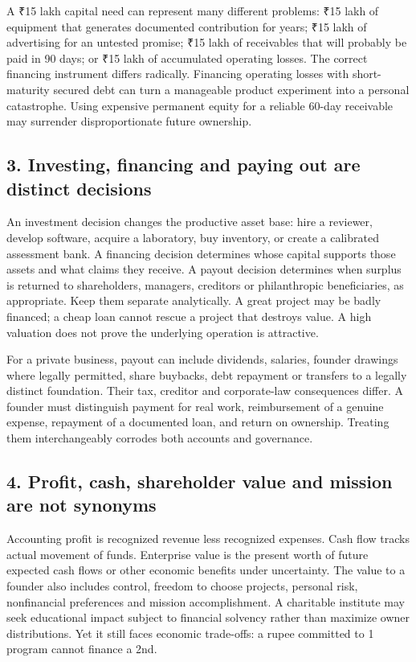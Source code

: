 A ₹15 lakh capital need can represent many different problems: ₹15 lakh of equipment that generates documented contribution for years; ₹15 lakh of advertising for an untested promise; ₹15 lakh of receivables that will probably be paid in 90 days; or ₹15 lakh of accumulated operating losses. The correct financing instrument differs radically. Financing operating losses with short-maturity secured debt can turn a manageable product experiment into a personal catastrophe. Using expensive permanent equity for a reliable 60-day receivable may surrender disproportionate future ownership.

\subsection{3. Investing, financing and paying out are distinct decisions}


An investment decision changes the productive asset base: hire a reviewer, develop software, acquire a laboratory, buy inventory, or create a calibrated assessment bank. A financing decision determines whose capital supports those assets and what claims they receive. A payout decision determines when surplus is returned to shareholders, managers, creditors or philanthropic beneficiaries, as appropriate. Keep them separate analytically. A great project may be badly financed; a cheap loan cannot rescue a project that destroys value. A high valuation does not prove the underlying operation is attractive.

For a private business, payout can include dividends, salaries, founder drawings where legally permitted, share buybacks, debt repayment or transfers to a legally distinct foundation. Their tax, creditor and corporate-law consequences differ. A founder must distinguish payment for real work, reimbursement of a genuine expense, repayment of a documented loan, and return on ownership. Treating them interchangeably corrodes both accounts and governance.

\subsection{4. Profit, cash, shareholder value and mission are not synonyms}


Accounting profit is recognized revenue less recognized expenses. Cash flow tracks actual movement of funds. Enterprise value is the present worth of future expected cash flows or other economic benefits under uncertainty. The value to a founder also includes control, freedom to choose projects, personal risk, nonfinancial preferences and mission accomplishment. A charitable institute may seek educational impact subject to financial solvency rather than maximize owner distributions. Yet it still faces economic trade-offs: a rupee committed to 1 program cannot finance a 2nd.

